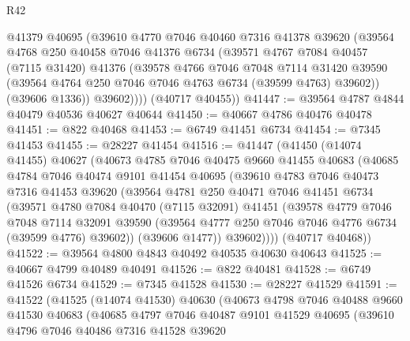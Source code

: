 \begin{lexlean}{R42}
\begin{coremodule}
{          @41379
          @40695
          (@39610
            @4770
            @7046
            @40460
            @7316
            @41378
            @39620
            (@39564
              @4768
              @250
              @40458
              @7046
              @41376
              @6734
              (@39571
                @4767
                @7084
                @40457
                (@7115 @31420)
                @41376
                (@39578
                  @4766
                  @7046
                  @7048
                  @7114
                  @31420
                  @39590
                  (@39564 @4764 @250 @7046 @7046 @4763 @6734 (@39599 @4763) @39602))
                (@39606 @1336))
              @39602))))
      (@40717 @40455))
@41447 := @39564 @4787 @4844 @40479 @40536 @40627 @40644
@41450 := @40667 @4786 @40476 @40478
@41451 := @822 @40468
@41453 := @6749 @41451 @6734
@41454 := @7345 @41453
@41455 := @28227 @41454
@41516 := @41447
    (@41450
      (@14074 @41455)
      @40627
      (@40673
        @4785
        @7046
        @40475
        @9660
        @41455
        @40683
        (@40685
          @4784
          @7046
          @40474
          @9101
          @41454
          @40695
          (@39610
            @4783
            @7046
            @40473
            @7316
            @41453
            @39620
            (@39564
              @4781
              @250
              @40471
              @7046
              @41451
              @6734
              (@39571
                @4780
                @7084
                @40470
                (@7115 @32091)
                @41451
                (@39578
                  @4779
                  @7046
                  @7048
                  @7114
                  @32091
                  @39590
                  (@39564 @4777 @250 @7046 @7046 @4776 @6734 (@39599 @4776) @39602))
                (@39606 @1477))
              @39602))))
      (@40717 @40468))
@41522 := @39564 @4800 @4843 @40492 @40535 @40630 @40643
@41525 := @40667 @4799 @40489 @40491
@41526 := @822 @40481
@41528 := @6749 @41526 @6734
@41529 := @7345 @41528
@41530 := @28227 @41529
@41591 := @41522
    (@41525
      (@14074 @41530)
      @40630
      (@40673
        @4798
        @7046
        @40488
        @9660
        @41530
        @40683
        (@40685
          @4797
          @7046
          @40487
          @9101
          @41529
          @40695
          (@39610
            @4796
            @7046
            @40486
            @7316
            @41528
            @39620
}
\end{coremodule}
\end{lexlean}
